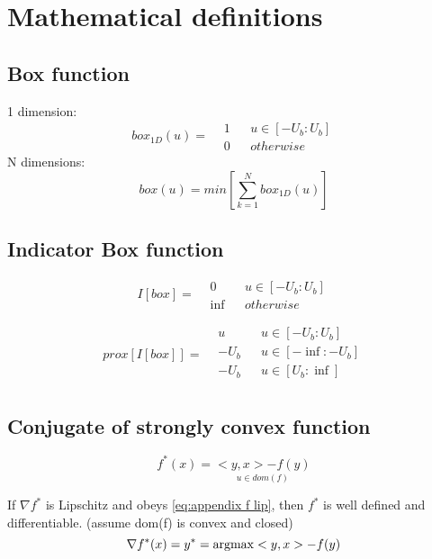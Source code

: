 \chapter{Mathematical definitions}
	\section{Box function}
		1 dimension:
		\begin{equation}
			box_{1D}(u) =
			\begin{aligned}
			 & 1 && u \in [-U_b:U_b]\\
			 & 0 && otherwise
			\end{aligned}
			\label{eq:box function 1 dimension}
		\end{equation}
		N dimensions:
		\begin{equation}
		box(u) = min\left[ \sum_{k=1}^ N box_{1D}(u) \right]
		\label{eq:box function N dimensions}
		\end{equation}
	\section{Indicator Box function}
		\begin{equation}
			I[box]=
			\begin{aligned}
			& 0 && u \in [-U_b:U_b]\\
			& \inf && otherwise
			\end{aligned}
		\end{equation}
		
		\begin{equation}
		prox[I[box]]=
		\begin{aligned}
		& u && u \in [-U_b:U_b]\\
		& -U_b && u \in [-\inf:-U_b]\\
		& -U_b && u \in [U_b:\inf]\\
		\end{aligned}
		\end{equation}
	\section{Conjugate of strongly convex function}
		\begin{equation}
			f^*(x)= \underset{u \in dom(f)}{<y,x>-f(y)}
		\end{equation}
		
		If $\nabla f^*$ is Lipschitz and obeys \eqref{eq:appendix f lip}, then $f^*$ is well defined and differentiable. (assume dom(f) is convex and closed)
		\begin{equation}
			\nabla f^*(x) = y^* = \operatorname{argmax} <y,x> - f(y)
		\end{equation}
		
